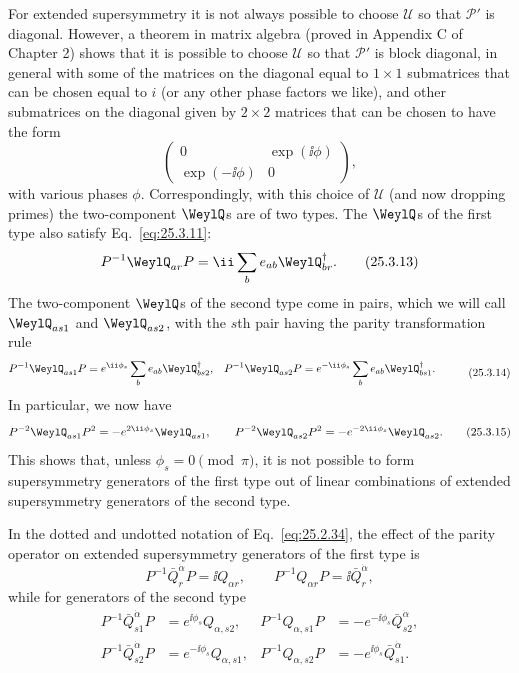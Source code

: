 For extended supersymmetry it is not always possible to choose \(\mathcal U\)
so that \(\mathcal P'\) is diagonal. However, a theorem in matrix algebra
(proved in Appendix C of Chapter 2) shows that it is possible to choose
\(\mathcal U\) so that \(\mathcal P'\) is block diagonal, in general with
some of the matrices on the diagonal equal to \(1\times1\) submatrices that
can be chosen equal to \(i\) (or any other phase factors we like), and other
submatrices on the diagonal given by \(2\times2\) matrices that can be chosen
to have the form
\[
\begin{pmatrix}
0&\exp(\ii\phi)\\
\exp(-\ii\phi)&0
\end{pmatrix},
\]
with various phases \(\phi\). Correspondingly, with this choice of
\(\mathcal U\) (and now dropping primes) the two-component \(\WeylQ\)s are of
two types. The \(\WeylQ\)s of the first type also satisfy
Eq.~\eqref{eq:25.3.11}:
\begin{equation}
P^{-1}\WeylQ_{ar}P
=\ii\sum_b e_{ab}\WeylQ_{br}^\dagger.
\tag{25.3.13}\label{eq:25.3.13}
\end{equation}
The two-component \(\WeylQ\)s of the second type come in pairs, which we will
call \(\WeylQ_{as1}\) and \(\WeylQ_{as2}\), with the \(s\)th pair having the
parity transformation rule
\begin{equation}
\begin{aligned}
P^{-1}\WeylQ_{as1}P
&=e^{\ii\phi_s}\sum_b e_{ab}\WeylQ_{bs2}^{\dagger},
&
P^{-1}\WeylQ_{as2}P
&=e^{-\ii\phi_s}\sum_b e_{ab}\WeylQ_{bs1}^{\dagger}.
\end{aligned}
\tag{25.3.14}\label{eq:25.3.14}
\end{equation}
In particular, we now have
\begin{equation}
P^{-2}\WeylQ_{as1}P^2=-e^{2\ii\phi_s}\WeylQ_{as1},
\qquad
P^{-2}\WeylQ_{as2}P^2=-e^{-2\ii\phi_s}\WeylQ_{as2}.
\tag{25.3.15}\label{eq:25.3.15}
\end{equation}
This shows that, unless \(\phi_s=0\pmod{\pi}\), it is not possible to form
supersymmetry generators of the first type out of linear combinations of
extended supersymmetry generators of the second type.

In the dotted and undotted notation of Eq.~\eqref{eq:25.2.34}, the effect
of the parity operator on extended supersymmetry generators of the first
type is
\begin{equation}
P^{-1}\bar Q^{\dot\alpha}_rP=\ii Q_{\alpha r},
\qquad
P^{-1}Q_{\alpha r}P=\ii\bar Q^{\dot\alpha}_r,
\tag{25.3.16}\label{eq:25.3.16}
\end{equation}
while for generators of the second type
\begin{equation}
\begin{aligned}
P^{-1}\bar Q^{\dot\alpha}_{s1}P
&=e^{\ii\phi_s}Q_{\alpha,s2},
&
P^{-1}Q_{\alpha,s1}P
&=-e^{-\ii\phi_s}\bar Q^{\dot\alpha}_{s2},
\\
P^{-1}\bar Q^{\dot\alpha}_{s2}P
&=e^{-\ii\phi_s}Q_{\alpha,s1},
&
P^{-1}Q_{\alpha,s2}P
&=-e^{\ii\phi_s}\bar Q^{\dot\alpha}_{s1}.
\end{aligned}
\tag{25.3.17}\label{eq:25.3.17}
\end{equation}
